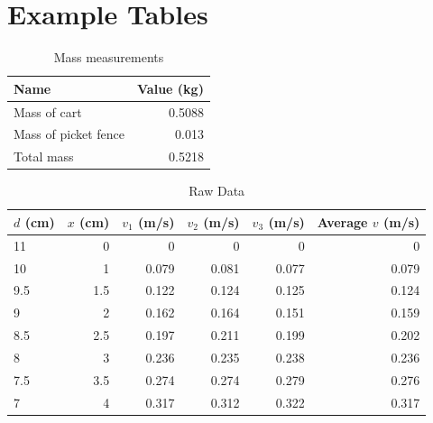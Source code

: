 \section{Example Tables}
%
\begin{table}[ht]
    \centering
    \begin{tabular}{|l|r|}
        \hline
        Name & Value (kg) \\
        \hline
        Mass of cart & 0.5088 \\
        Mass of picket fence & 0.013 \\
        \hline
        Total mass & 0.5218 \\
        \hline
    \end{tabular}
    \caption{Mass measurements}
    \label{table:06.mass}
\end{table}
%
\begin{table}[ht]
    \centering
    \begin{tabular}{|l|r|r|r|r|r|}
        \hline
        $d$ (cm) & $x$ (cm) & $v_{1}$ (m/s) & $v_{2}$ (m/s) & $v_{3}$ (m/s) & Average $v$ (m/s) \\
        \hline
        11 & 0 & 0 & 0 & 0 & 0 \\
        10 & 1 & 0.079 & 0.081 & 0.077 & 0.079 \\
        9.5 & 1.5 & 0.122 & 0.124 & 0.125 & 0.124 \\
        9 & 2 & 0.162 & 0.164 & 0.151 & 0.159 \\
        8.5 & 2.5 & 0.197 & 0.211 & 0.199 & 0.202 \\
        8 & 3 & 0.236 & 0.235 & 0.238 & 0.236 \\
        7.5 & 3.5 & 0.274 & 0.274 & 0.279 & 0.276 \\
        7 & 4 & 0.317 & 0.312 & 0.322 & 0.317 \\
        \hline
    \end{tabular}
    \caption{Raw Data}
    \label{table:06.data}
\end{table}
%
\newpage
